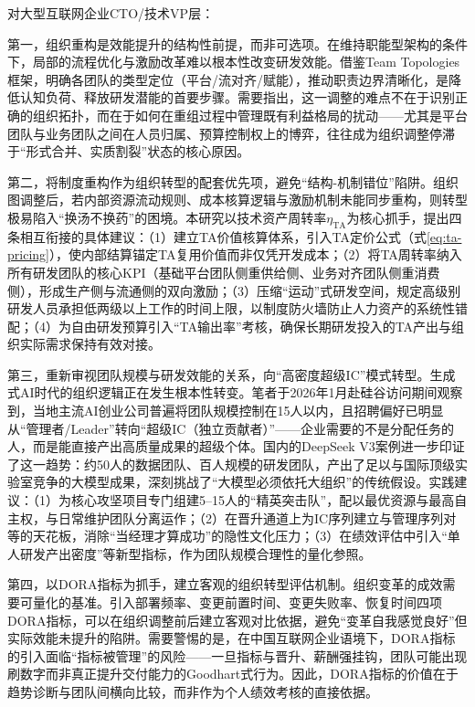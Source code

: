 对大型互联网企业CTO/技术VP层：

第一，组织重构是效能提升的结构性前提，而非可选项。在维持职能型架构的条件下，局部的流程优化与激励改革难以根本性改变研发效能。借鉴Team Topologies框架，明确各团队的类型定位（平台/流对齐/赋能），推动职责边界清晰化，是降低认知负荷、释放研发潜能的首要步骤\cite{skelton2019team}。需要指出，这一调整的难点不在于识别正确的组织拓扑，而在于如何在重组过程中管理既有利益格局的扰动——尤其是平台团队与业务团队之间在人员归属、预算控制权上的博弈，往往成为组织调整停滞于“形式合并、实质割裂”状态的核心原因。

第二，将制度重构作为组织转型的配套优先项，避免“结构-机制错位”陷阱。组织图调整后，若内部资源流动规则、成本核算逻辑与激励机制未能同步重构，则转型极易陷入“换汤不换药”的困境。本研究以技术资产周转率$\eta_{\mathrm{TA}}$为核心抓手，提出四条相互衔接的具体建议：（1）建立TA价值核算体系，引入TA定价公式（式\eqref{eq:ta-pricing}），使内部结算锚定TA复用价值而非仅凭开发成本；（2）将TA周转率纳入所有研发团队的核心KPI（基础平台团队侧重供给侧、业务对齐团队侧重消费侧），形成生产侧与流通侧的双向激励；（3）压缩“运动”式研发空间，规定高级别研发人员承担低两级以上工作的时间上限，以制度防火墙防止人力资产的系统性错配；（4）为自由研发预算引入“TA输出率”考核，确保长期研发投入的TA产出与组织实际需求保持有效对接。

第三，重新审视团队规模与研发效能的关系，向“高密度超级IC”模式转型。生成式AI时代的组织逻辑正在发生根本性转变。笔者于2026年1月赴硅谷访问期间观察到，当地主流AI创业公司普遍将团队规模控制在15人以内，且招聘偏好已明显从“管理者/Leader”转向“超级IC（独立贡献者）”——企业需要的不是分配任务的人，而是能直接产出高质量成果的超级个体。国内的DeepSeek V3案例进一步印证了这一趋势：约50人的数据团队、百人规模的研发团队，产出了足以与国际顶级实验室竞争的大模型成果，深刻挑战了“大模型必须依托大组织”的传统假设。实践建议：（1）为核心攻坚项目专门组建5--15人的“精英突击队”，配以最优资源与最高自主权，与日常维护团队分离运作；（2）在晋升通道上为IC序列建立与管理序列对等的天花板，消除“当经理才算成功”的隐性文化压力；（3）在绩效评估中引入“单人研发产出密度”等新型指标，作为团队规模合理性的量化参照。

第四，以DORA指标为抓手，建立客观的组织转型评估机制。组织变革的成效需要可量化的基准。引入部署频率、变更前置时间、变更失败率、恢复时间四项DORA指标，可以在组织调整前后建立客观对比依据，避免“变革自我感觉良好”但实际效能未提升的陷阱\cite{forsgren2018accelerate}。需要警惕的是，在中国互联网企业语境下，DORA指标的引入面临“指标被管理”的风险——一旦指标与晋升、薪酬强挂钩，团队可能出现刷数字而非真正提升交付能力的Goodhart式行为。因此，DORA指标的价值在于趋势诊断与团队间横向比较，而非作为个人绩效考核的直接依据。

